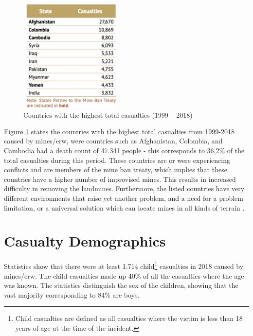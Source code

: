         \vspace{2mm}

\begin{figure}
    \vspace{-5mm}
    \centering
      \includegraphics[width=0.45\textwidth]{00 - Images/casualties_per_country.png}
  \caption{Countries with the highest total casualties (1999 – 2018) \cite{LandmineMonitor2019}}
  \label{fig:casualties_per_country}
\end{figure}

Figure \ref{fig:casualties_per_country} states the countries with the highest total casualties from 1999-2018 caused by mines/\gls{erw}, were countries such as Afghanistan, Colombia, and Cambodia had a death count of 47.341 people - this corresponds to 36,2\% of the total casualties during this period. These countries are or were experiencing conflicts and are members of the mine ban treaty, which implies that these countries have a higher number of improvised mines. This results in increased difficulty in removing the landmines. Furthermore, the listed countries have very different environments that raise yet another problem, and a need for a problem limitation, or a universal solution which can locate mines in all kinds of terrain \cite{LandmineMonitor2019}.

\clearpage

\section{Casualty Demographics}
Statistics show that there were at least 1.714 child\footnote{Child casualties are defined as all casualties where the victim is less than 18 years of age at the time of the incident.} casualties in 2018 caused by mines/\gls{erw}. The child casualties made up 40\% of all the casualties where the age was known. The statistics distinguish the sex of the children, showing that the vast majority corresponding to 84\% are boys.

